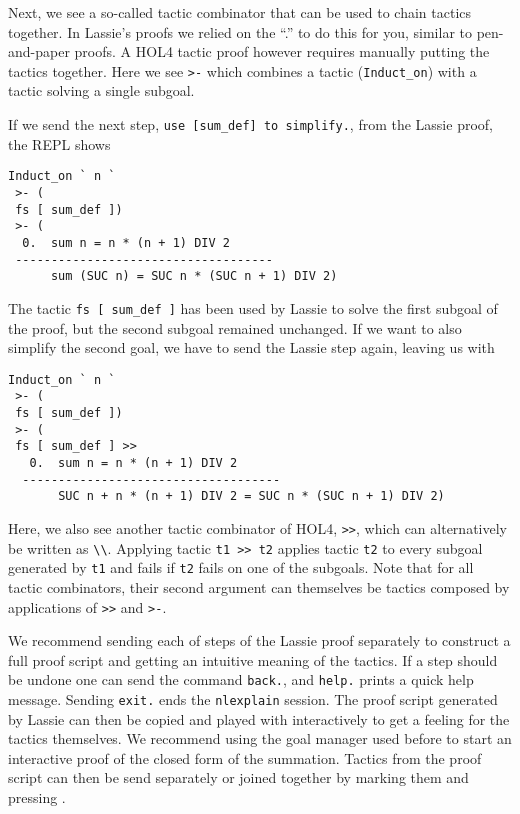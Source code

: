 Next, we see a so-called tactic combinator that can be used to chain tactics
together.
In Lassie's proofs we relied on the ``.'' to do this for you, similar to
pen-and-paper proofs.
A HOL4 tactic proof however requires manually putting the tactics together.
Here we see \lstinline{>-} which combines a tactic (\lstinline{Induct_on})
with a tactic solving a single subgoal.

If we send the next step, \lstinline{use [sum_def] to simplify.}, from the Lassie proof, the REPL shows
%
\begin{lstlisting}[frame=single]
Induct_on ` n `
 >- (
 fs [ sum_def ])
 >- (
  0.  sum n = n * (n + 1) DIV 2
 ------------------------------------
      sum (SUC n) = SUC n * (SUC n + 1) DIV 2)
\end{lstlisting}

The tactic \lstinline{fs [ sum_def ]} has been used by Lassie to solve the first subgoal
of the proof, but the second subgoal remained unchanged.
If we want to also simplify the second goal, we have to send the Lassie step again,
leaving us with
%
\begin{lstlisting}[frame=single]
Induct_on ` n `
 >- (
 fs [ sum_def ])
 >- (
 fs [ sum_def ] >>
   0.  sum n = n * (n + 1) DIV 2
  ------------------------------------
       SUC n + n * (n + 1) DIV 2 = SUC n * (SUC n + 1) DIV 2)
\end{lstlisting}

Here, we also see another tactic combinator of HOL4, \lstinline{>>}, which can
alternatively be written as \lstinline{\\}.
Applying tactic \lstinline{t1 >> t2} applies tactic \lstinline{t2} to every
subgoal  generated by \lstinline{t1} and fails if \lstinline{t2} fails on one of
the subgoals.
Note that for all tactic combinators, their second argument can themselves be
tactics composed by applications of \lstinline{>>} and \lstinline{>-}.

We recommend sending each of steps of the Lassie proof separately to construct a
full proof script and getting an intuitive meaning of the tactics.
If a step should be undone one can send the command \lstinline{back.}, and
\lstinline{help.} prints a quick help message.
Sending \lstinline{exit.} ends the \lstinline{nlexplain} session.
The proof script generated by Lassie can then be copied and played with
interactively to get a feeling for the tactics themselves.
We recommend using the goal manager used before to start an interactive proof of
the closed form of the summation.
Tactics from the proof script can then be send separately or joined together by
marking them and pressing .